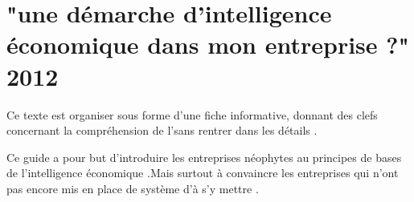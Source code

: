  \part{"une démarche d'intelligence économique dans mon entreprise ?" 2012}
 
 
 Ce texte est organiser sous forme d'une fiche informative, donnant des clefs concernant la compréhension de l'\ie sans rentrer dans les détails .
 
 Ce guide a pour but d'introduire les entreprises néophytes au principes de bases de l'intelligence économique .Mais surtout à convaincre les entreprises qui n'ont pas encore mis en place de système d'\ie  à s'y mettre . 
  
